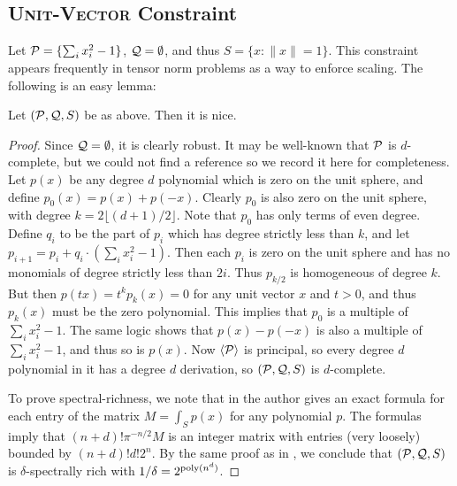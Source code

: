 \subsection{\textsc{Unit-Vector} Constraint}
Let $\mathcal P = \{\sum_i x_i^2 - 1\}$, $\mathcal Q = \emptyset$, and thus $S = \{x: \|x\| = 1\}$. This constraint appears frequently in tensor norm problems as a way to enforce scaling. The following is an easy lemma:
\begin{lemma}
Let $(\mathcal P, \mathcal Q, S)$ be as above. Then it is nice. 
\end{lemma}
\begin{proof}
Since $\mathcal Q = \emptyset$, it is clearly robust. It may be well-known that $\mathcal P$ is $d$-complete, but we could not find a reference so we record it here for completeness. Let $p(x)$ be any degree $d$ polynomial which is zero on the unit sphere, and define $p_0(x) = p(x) + p(-x)$. Clearly $p_0$ is also zero on the unit sphere, with degree $k = 2\lfloor (d+1)/2 \rfloor$. Note that $p_0$ has only terms of even degree. Define $q_i$ to be the part of $p_i$ which has degree strictly less than $k$, and let $p_{i+1} = p_i + q_i\cdot(\sum_i x_i^2 - 1)$. Then each $p_i$ is zero on the unit sphere and has no monomials of degree strictly less than $2i$. Thus $p_{k/2}$ is homogeneous of degree $k$. But then $p(tx) = t^kp_k(x) = 0$ for any unit vector $x$ and $t > 0$, and thus $p_k(x)$ must be the zero polynomial. This implies that $p_0$ is a multiple of $\sum_i x_i^2 - 1$. The same logic shows that $p(x) - p(-x)$ is also a multiple of $\sum_i x_i^2 - 1$, and thus so is $p(x)$. Now $\langle \mathcal P\rangle$ is principal, so every degree $d$ polynomial in it has a degree $d$ derivation, so $(\mathcal P, \mathcal Q, S)$ is $d$-complete.

To prove spectral-richness, we note that in \cite{10.2307/2695802} the author gives an exact formula for each entry of the matrix $M = \int_{S} p(x)$ for any polynomial $p$. The formulas imply that $(n+d)!\pi^{-n/2} M$ is an integer matrix with entries (very loosely) bounded by $(n+d)!d!2^n$. By the same proof as in , we conclude that $(\mathcal P, \mathcal Q, S)$ is $\delta$-spectrally rich with $1/\delta = 2^{\operatorname{poly}(n^d)}$.
\end{proof}

